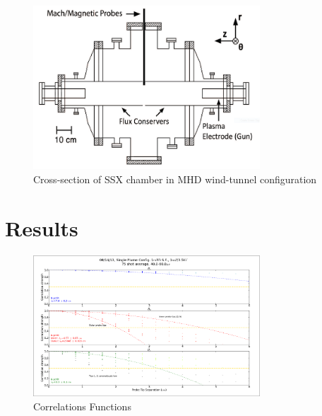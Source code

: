 \documentclass[aip,prl,amsmath,amssymb,reprint,superscriptaddress]{revtex4-1} %
\begin{document}
\begin{figure}[!htbp]
\centerline{
\includegraphics[width=8.5cm]{chamberEdit.png}}
\caption{\label{fig:chamber} Cross-section of SSX chamber in MHD wind-tunnel configuration}
\end{figure}

\section{Results}

\begin{figure}[!htbp]
\centerline{
\includegraphics[width=8.5cm]{BrBtBz_correlations.png}}
\caption{\label{fig:BrBtBz_correlations} Correlations Functions}
\end{figure}
\end{document}
